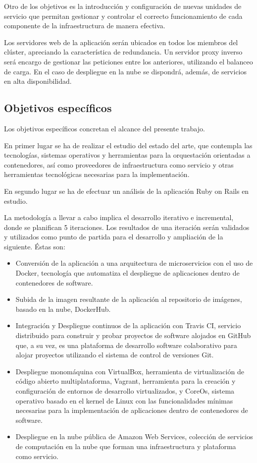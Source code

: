 Otro de los objetivos es la introducción y configuración de nuevas unidades de servicio que permitan gestionar y controlar el correcto funcionamiento de cada componente de la infraestructura de manera efectiva.

Los servidores web de la aplicación serán ubicados en todos los miembros del clúster, apreciando la característica de redundancia. Un servidor proxy inverso será encargo de gestionar las peticiones entre los anteriores, utilizando el balanceo de carga. En el caso de despliegue en la nube se dispondrá, además, de servicios en alta disponibilidad.

\subsection{Objetivos específicos}

Los objetivos específicos concretan el alcance del presente trabajo.

En primer lugar se ha de realizar el estudio del estado del arte, que contempla las tecnologías, sistemas operativos y herramientas para la orquestación orientadas a contenedores, así como proveedores de infraestructura como servicio y otras herramientas tecnológicas necesarias para la implementación. 

En segundo lugar se ha de efectuar un análisis de la aplicación Ruby on Rails en estudio.

La metodología a llevar a cabo implica el desarrollo iterativo e incremental, donde se planifican 5 iteraciones. Los resultados de una iteración serán validados y utilizados como punto de partida para el desarrollo y ampliación de la siguiente. Éstas son:
\begin{itemize}
\item Conversión de la aplicación a una arquitectura de microservicios con el uso de Docker, tecnología que automatiza el despliegue de aplicaciones dentro de contenedores de software.
\item Subida de la imagen resultante de la aplicación al repositorio de imágenes, basado en la nube, DockerHub.
\item Integración y Despliegue continuos de la aplicación con Travis CI, servicio distribuido para construir y probar proyectos de software alojados en GitHub que, a su vez, es una plataforma de desarrollo software colaborativo para alojar proyectos utilizando el sistema de control de versiones Git.
\item Despliegue monomáquina con VirtualBox, herramienta de virtualización de código abierto multiplataforma, Vagrant, herramienta para la creación y configuración de entornos de desarrollo virtualizados, y CoreOs, sistema operativo basado en el kernel de Linux con las funcionalidades mínimas necesarias para la implementación de aplicaciones dentro de contenedores de software.
\item Despliegue en la nube pública de Amazon Web Services, colección de servicios de computación en la nube que forman una infraestructura y plataforma como servicio.
\end{itemize}

